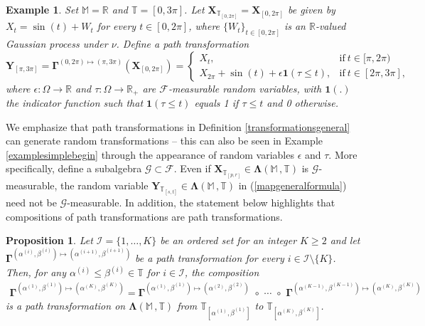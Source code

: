 \documentclass[12pt,a4paper]{article}
\newtheorem{ex}[thm]{Example}
\newtheorem{prop}[thm]{Proposition}
\def\R{\mathbb{R}}
\def\T{\mathbb{T}}
\def\F{\mathscr{F}}
\def\G{\mathscr{G}}
\begin{document}
\begin{ex}
\emph{\label{examplesimplebegin}
Set $\mathbb M=\R$ and $\T=[0,3\pi]$. Let $\boldsymbol{X}_{\T_{[0,2\pi]}} = \boldsymbol{X}_{[0,2\pi]}$ be given by $X_t = \sin(t) + W_t$ for every $t\in[0,2\pi]$, where $\{W_t\}_{t\in[0,2\pi]}$ is an $\R$-valued Gaussian process under $\nu$. Define a path transformation
\begin{equation}
    \boldsymbol{Y}_{[\pi,3\pi]} = \boldsymbol{\Gamma}^{(0,2\pi)\mapsto(\pi,3\pi)}\left(\boldsymbol{X}_{[0,2\pi]}\right) =
\begin{cases}
			X_t, & \text{if}\ t\in [\pi,2\pi) \\
      X_{2\pi} + \sin(t) + \epsilon\mathbf{1}(\tau \leq t), & \text{if}\ t\in[2\pi,3\pi],
\end{cases}
\end{equation}
where $\epsilon: \Omega \rightarrow \R $ and $\tau: \Omega \rightarrow \R_+$ are $\F$-measurable random variables, with $\mathbf{1}(.)$ the indicator function such that $\mathbf{1}(\tau \leq t)$ equals 1 if $\tau \leq t$ and 0 otherwise.}
\end{ex} 
We emphasize that path transformations in Definition \ref{transformationsgeneral} can generate random transformations -- this can also be seen in Example \ref{examplesimplebegin} through the appearance of random variables $\epsilon$ and $\tau$. More specifically, define a subalgebra $\G \subset \F$. Even if $\boldsymbol{X}_{\T_{[p,r]}} \in \boldsymbol{\Lambda}(\mathbb M \,, \T)$ is $\G$-measurable, the random variable $\boldsymbol{Y}_{\T_{[s,t]}}\in \boldsymbol{\Lambda}(\mathbb M \,, \T)$ in (\ref{mapgeneralformula}) need not be $\G$-measurable. In addition, the statement below highlights that compositions of path transformations are path transformations.
\begin{prop}
Let $\mathcal{I} = \{1,\ldots,K\}$ be an ordered set for an integer $K\geq 2$ and let $\boldsymbol{\Gamma}^{\left(\alpha^{(i)},\beta^{(i)}\right)\mapsto\left(\alpha^{(i+1)},\beta^{(i+1)}\right)}$ be a path transformation for every $i\in\mathcal{I}\setminus\{K\}$. Then, for any $\alpha^{(i)}\leq \beta^{(i)} \in \T$ for $i\in\mathcal{I}$, the composition
\begin{align}
\boldsymbol{\Gamma}^{\left(\alpha^{(1)},\beta^{(1)}\right)\mapsto\left(\alpha^{(K)},\beta^{(K)}\right)} = \boldsymbol{\Gamma}^{\left(\alpha^{(1)},\beta^{(1)}\right)\mapsto\left(\alpha^{(2)},\beta^{(2)}\right)} \,\, \circ \,\, \cdots \,\, \circ \,\, \boldsymbol{\Gamma}^{\left(\alpha^{(K-1)},\beta^{(K-1)}\right)\mapsto\left(\alpha^{(K)},\beta^{(K)}\right)} \label{compositionmapped}
\end{align} 
is a path transformation on $\boldsymbol{\Lambda}(\mathbb M \,, \T)$ from $\T_{[\alpha^{(1)},\beta^{(1)}]}$ to $\T_{[\alpha^{(K)},\beta^{(K)}]}$.
\end{prop}
\end{document}

